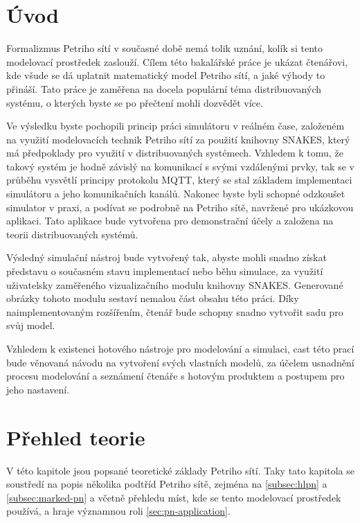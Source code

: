 \chapter{Úvod}
\label{chap:uvod}

Formalizmus Petriho sítí v současné době nemá tolik uznání, kolík si tento modelovací prostředek zaslouží. Cílem této bakalářské práce je ukázat čtenářovi, kde všude se dá uplatnit matematický model Petriho sítí, a jaké výhody to přináší. Tato práce je zaměřena na docela populární téma distribuovaných systému, o kterých byste se po přečtení mohli dozvědět více.

Ve výsledku byste pochopili princip práci simulátoru v reálném čase, založeném na využití modelovacích technik Petriho sítí za použití knihovny SNAKES, který má předpoklady pro využití v distribuovaných systémech. Vzhledem k tomu, že takový systém je hodně závislý na komunikací s svými vzdálenými prvky, tak se v průběhu vysvětlí principy protokolu MQTT, který se stal základem implementaci simulátoru a jeho komunikačních kanálů. Nakonec byste byli schopné odzkoušet simulator v praxi, a podívat se podrobně na Petriho sítě, navržené pro ukázkovou aplikaci. Tato aplikace bude vytvořena pro demonstrační účely a založena na teorii distribuovaných systémů.

Výsledný simulační nástroj bude vytvořený tak, abyste mohli snadno získat představu o současném stavu implementací nebo běhu simulace, za využití uživatelsky zaměřeného vizualizačního modulu knihovny SNAKES. Generované obrázky tohoto modulu sestaví nemalou část obsahu této práci. Díky naimplementovaným rozšířením, čtenář bude schopny snadno vytvořit sadu pro svůj model.

Vzhledem k existenci hotového nástroje pro modelování a simulaci, cast této prací bude věnovaná návodu na vytvoření svých vlastních modelů, za účelem usnadnění procesu modelování a seznámení čtenáře s hotovým produktem a postupem pro jeho nastavení.

\chapter{Přehled teorie}
\label{chapp:prehled}

V této kapitole jsou popsané teoretické základy Petriho sítí. Taky tato kapitola se soustředí na popis několika podtříd Petriho sítě, zejména na  \ref{subsec:hlpn} a  \ref{subsec:marked-pn} a  včetně přehledu míst, kde se tento modelovací prostředek používá, a hraje významnou roli \ref{sec:pn-application}.


